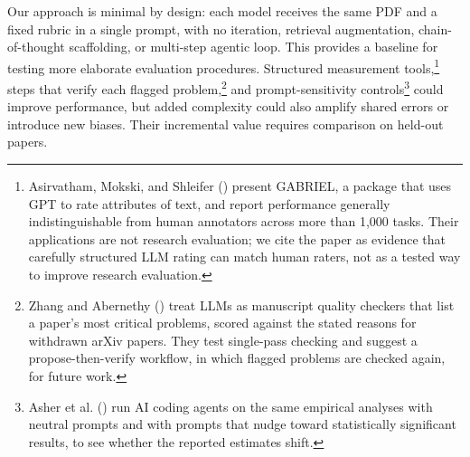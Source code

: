 \documentclass[
  11pt,
  letterpaper,
]{article}
\begin{document}
Our approach is minimal by design: each model receives the same PDF and
a fixed rubric in a single prompt, with no iteration, retrieval
augmentation, chain-of-thought scaffolding, or multi-step agentic loop.
This provides a baseline for testing more elaborate evaluation
procedures. Structured measurement tools,\footnote{Asirvatham, Mokski,
  and Shleifer
  ()
  present GABRIEL, a package that uses GPT to rate attributes of text,
  and report performance generally indistinguishable from human
  annotators across more than 1,000 tasks. Their applications are not
  research evaluation; we cite the paper as evidence that carefully
  structured LLM rating can match human raters, not as a tested way to
  improve research evaluation.} steps that verify each flagged
problem,\footnote{Zhang and Abernethy ()
  treat LLMs as manuscript quality checkers that list a paper's most
  critical problems, scored against the stated reasons for withdrawn
  arXiv papers. They test single-pass checking and suggest a
  propose-then-verify workflow, in which flagged problems are checked
  again, for future work.} and {prompt-sensitivity controls}\footnote{Asher
  et al.
  ()
  run AI coding agents on the same empirical analyses with neutral
  prompts and with prompts that nudge toward statistically significant
  results, to see whether the reported estimates shift.} could improve
performance, but added complexity could also amplify shared errors or
introduce new biases. Their incremental value requires comparison on
held-out papers.
\end{document}
